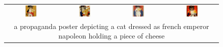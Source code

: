\begin{figure}[ht!]
\begin{tabular}{cccc}
        \includegraphics[width=0.24\textwidth]{figures/cross/cat_0.jpg} &
        \includegraphics[width=0.24\textwidth]{figures/cross/cat_1.jpg} &
        \includegraphics[width=0.24\textwidth]{figures/cross/cat_2.jpg} &
        \includegraphics[width=0.24\textwidth]{figures/cross/cat_3.jpg} \vspace{-1mm}\\
        \multicolumn{4}{c}{\small a propaganda poster depicting a cat dressed as french emperor napoleon holding a piece of cheese}\\
        

\end{tabular}
\end{figure}
